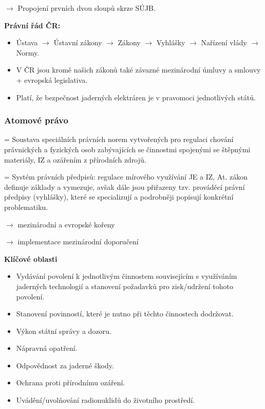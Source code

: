 $\rightarrow$ Propojení prvních dvou sloupů skrze SÚJB.

\textbf{Právní řád ČR:}

\begin{itemize}
    \item Ústava $\rightarrow$ Ústavní zákony $\rightarrow$ Zákony $\rightarrow$ Vyhlášky $\rightarrow$ Nařízení vlády $\rightarrow$ Normy.
    \item V ČR jsou kromě našich zákonů také závazné mezinárodní úmluvy a smlouvy + evropská legislativa.
    \item Platí, že bezpečnost jaderných elektráren je v pravomoci jednotlivých států.
\end{itemize}

\subsubsection{Atomové právo}

= Soustava speciálních právních norem vytvořených pro regulaci chování právnických a fyzických osob zabývajících se činnostmi spojenými se štěpnými materiály, IZ a ozářením z přírodních zdrojů.

= Systém právních předpisů: regulace mírového využívání JE a IZ, At. zákon definuje základy a vymezuje, avšak dále jsou přiřazeny tzv. prováděcí právní předpisy (vyhlášky), které se specializují a podrobněji popisují konkrétní problematiku.

$\rightarrow$ mezinárodní a evropské kořeny

$\rightarrow$ implementace mezinárodní doporučení

\textbf{Klíčové oblasti}

\begin{itemize}
    \item Vydávání povolení k jednotlivým činnostem souvisejícím s využíváním jaderných technologií a stanovení požadavků pro zisk/udržení tohoto povolení.
    \item Stanovení povinností, které je nutno při těchto činnostech dodržovat.
    \item Výkon státní správy a dozoru.
    \item Nápravná opatření.
    \item Odpovědnost za jaderné škody.
    \item Ochrana proti přírodnímu ozáření.
    \item Uvádění/uvolňování radionuklidů do životního prostředí.
\end{itemize}

